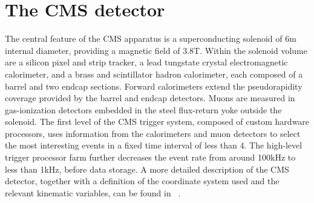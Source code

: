\section{The CMS detector}

The central feature of the CMS apparatus is a superconducting solenoid of 6\unit{m} internal diameter, 
providing a magnetic field of 3.8\unit{T}. Within the solenoid volume are a silicon pixel and strip tracker, a 
lead tungstate crystal electromagnetic calorimeter, and a brass and scintillator hadron calorimeter, each composed of 
a barrel and two endcap sections. Forward calorimeters extend the pseudorapidity~\cite{JINST} coverage provided by the
 barrel and endcap detectors. Muons are measured in gas-ionization detectors embedded in the steel flux-return yoke outside 
the solenoid. The first level of the CMS trigger system, composed of custom hardware processors, uses information from the 
calorimeters and muon detectors to select the most interesting events in a fixed time interval of less than 4\mus. The high-level
 trigger processor farm further decreases the event rate from around 100\unit{kHz} to less than 1\unit{kHz}, before data storage. 
A more detailed description of the CMS detector, together with a definition of the coordinate system used and the relevant 
kinematic variables, can be found in ~\cite{JINST}.
